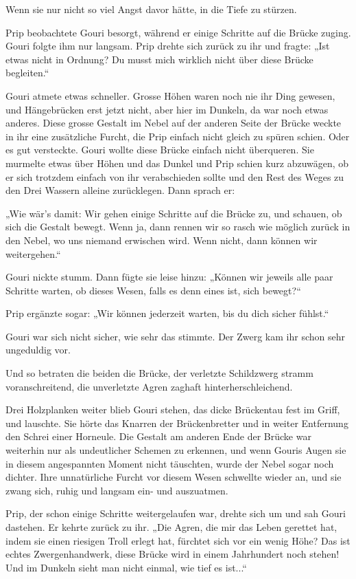 \documentclass[10pt, a4paper, oneside]{book}
\begin{document}
Wenn sie nur nicht so viel Angst davor hätte, in die Tiefe zu stürzen.

Prip beobachtete Gouri besorgt, während er einige Schritte auf die Brücke zuging. Gouri folgte ihm nur langsam. Prip drehte sich zurück zu ihr und fragte: „Ist etwas nicht in Ordnung? Du musst mich wirklich nicht über diese Brücke begleiten.“

Gouri atmete etwas schneller. Grosse Höhen waren noch nie ihr Ding gewesen, und Hängebrücken erst jetzt nicht, aber hier im Dunkeln, da war noch etwas anderes. Diese grosse Gestalt im Nebel auf der anderen Seite der Brücke weckte in ihr eine zusätzliche Furcht, die Prip einfach nicht gleich zu spüren schien. Oder es gut versteckte. Gouri wollte diese Brücke einfach nicht überqueren. Sie murmelte etwas über Höhen und das Dunkel und Prip schien kurz abzuwägen, ob er sich trotzdem einfach von ihr verabschieden sollte und den Rest des Weges zu den Drei Wassern alleine zurücklegen. Dann sprach er:

„Wie wär’s damit: Wir gehen einige Schritte auf die Brücke zu, und schauen, ob sich die Gestalt bewegt. Wenn ja, dann rennen wir so rasch wie möglich zurück in den Nebel, wo uns niemand erwischen wird. Wenn nicht, dann können wir weitergehen.“

Gouri nickte stumm. Dann fügte sie leise hinzu: „Können wir jeweils alle paar Schritte warten, ob dieses Wesen, falls es denn eines ist, sich bewegt?“

Prip ergänzte sogar: „Wir können jederzeit warten, bis du dich sicher fühlst.“

Gouri war sich nicht sicher, wie sehr das stimmte. Der Zwerg kam ihr schon sehr ungeduldig vor.

Und so betraten die beiden die Brücke, der verletzte Schildzwerg stramm voranschreitend, die unverletzte Agren zaghaft hinterherschleichend.

Drei Holzplanken weiter blieb Gouri stehen, das dicke Brückentau fest im Griff, und lauschte. Sie hörte das Knarren der Brückenbretter und in weiter Entfernung den Schrei einer Horneule. Die Gestalt am anderen Ende der Brücke war weiterhin nur als undeutlicher Schemen zu erkennen, und wenn Gouris Augen sie in diesem angespannten Moment nicht täuschten, wurde der Nebel sogar noch dichter. Ihre unnatürliche Furcht vor diesem Wesen schwellte wieder an, und sie zwang sich, ruhig und langsam ein- und auszuatmen.

Prip, der schon einige Schritte weitergelaufen war, drehte sich um und sah Gouri dastehen. Er kehrte zurück zu ihr. „Die Agren, die mir das Leben gerettet hat, indem sie einen riesigen Troll erlegt hat, fürchtet sich vor ein wenig Höhe? Das ist echtes Zwergenhandwerk, diese Brücke wird in einem Jahrhundert noch stehen! Und im Dunkeln sieht man nicht einmal, wie tief es ist...“
\end{document}
